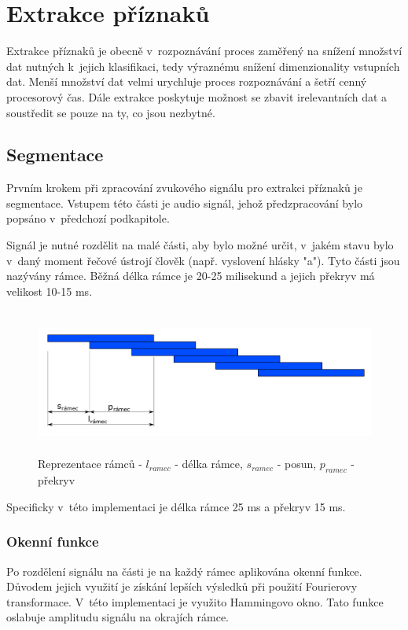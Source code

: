 \section{Extrakce příznaků}
Extrakce příznaků je obecně v~rozpoznávání proces zaměřený na snížení množství dat nutných k~jejich klasifikaci, tedy výraznému snížení dimenzionality vstupních dat. Menší množství dat velmi urychluje proces rozpoznávání a šetří cenný procesorový čas. Dále extrakce poskytuje možnost se zbavit irelevantních dat a soustředit se pouze na ty, co jsou nezbytné. 
\subsection{Segmentace}
Prvním krokem při zpracování zvukového signálu pro extrakci příznaků je segmentace. Vstupem této části je audio signál, jehož předzpracování bylo popsáno v~předchozí podkapitole.  

Signál je nutné rozdělit na malé části, aby bylo možné určit, v~jakém stavu bylo v~daný moment řečové ústrojí člověk (např. vyslovení hlásky "a"). Tyto části jsou nazývány rámce. Běžná délka rámce je 20-25 milisekund a jejich překryv má velikost 10-15 ms. 

\begin{figure}[H]
	\centering
		\includegraphics[height=4.8cm]{obrazky-figures/frames.pdf}
        \caption{Reprezentace rámců - $l_{ramec}$ - délka rámce, $s_{ramec}$ - posun, $p_{ramec}$ - překryv}
\end{figure}


Specificky v~této implementaci je délka rámce 25 ms a překryv 15 ms.
\subsubsection{Okenní funkce}
\label{sec:window_function}
Po rozdělení signálu na části je na každý rámec aplikována okenní funkce.  Důvodem jejich využití je získání lepších výsledků při použití Fourierovy transformace.
 V~této implementaci je využito Hammingovo okno. Tato funkce oslabuje amplitudu signálu na okrajích rámce.
 
